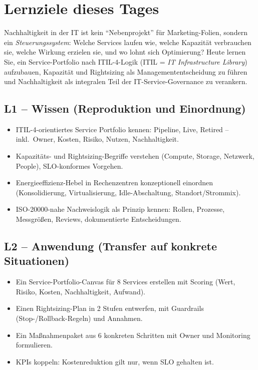 \documentclass[11pt,a4paper,oneside]{article}
\begin{document}
\section*{Lernziele dieses Tages}
\thispagestyle{plain}

\noindent Nachhaltigkeit in der IT ist kein ``Nebenprojekt'' für Marketing-Folien, sondern ein \emph{Steuerungssystem}: Welche Services laufen wie, welche Kapazität verbrauchen sie, welche Wirkung erzielen sie, und wo lohnt sich Optimierung? Heute lernen Sie, ein Service-Portfolio nach ITIL-4-Logik (ITIL = \emph{IT Infrastructure Library}) aufzubauen, Kapazität und Rightsizing als Managemententscheidung zu führen und Nachhaltigkeit als integralen Teil der IT-Service-Governance zu verankern.

\subsection*{L1 -- Wissen (Reproduktion und Einordnung)}
\begin{itemize}
  \item ITIL-4-orientiertes Service Portfolio kennen: Pipeline, Live, Retired -- inkl.\ Owner, Kosten, Risiko, Nutzen, Nachhaltigkeit.
  \item Kapazitäts- und Rightsizing-Begriffe verstehen (Compute, Storage, Netzwerk, People), SLO-konformes Vorgehen.
  \item Energieeffizienz-Hebel in Rechenzentren konzeptionell einordnen (Konsolidierung, Virtualisierung, Idle-Abschaltung, Standort/Strommix).
  \item ISO-20000-nahe Nachweislogik als Prinzip kennen: Rollen, Prozesse, Messgrößen, Reviews, dokumentierte Entscheidungen.
\end{itemize}

\subsection*{L2 -- Anwendung (Transfer auf konkrete Situationen)}
\begin{itemize}
  \item Ein Service-Portfolio-Canvas für 8 Services erstellen mit Scoring (Wert, Risiko, Kosten, Nachhaltigkeit, Aufwand).
  \item Einen Rightsizing-Plan in 2 Stufen entwerfen, mit Guardrails (Stop-/Rollback-Regeln) und Annahmen.
  \item Ein Maßnahmenpaket aus 6 konkreten Schritten mit Owner und Monitoring formulieren.
  \item KPIs koppeln: Kostenreduktion gilt nur, wenn SLO gehalten ist.
\end{itemize}
\end{document}
